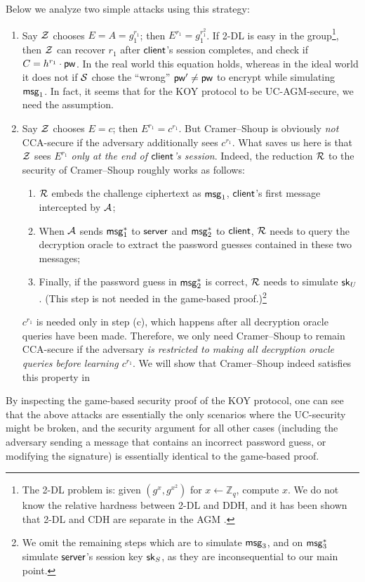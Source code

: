 Below we analyze two simple attacks using this strategy:
\begin{enumerate}
	\item Say $\mathcal{Z}$ chooses $E = A = g_1^{r_1}$; then $E^{r_1} = g_1^{r_1^2}$. If 2-DL is easy in the group\footnote{The 2-DL problem is: given $(g^x,g^{x^2})$ for $x \gets \mathbb{Z}_q$, compute $x$. We do not know the relative hardness between 2-DL and DDH, and it has been shown that 2-DL and CDH are separate in the AGM \cite{C:BauFucLos20}.}, then $\mathcal{Z}$ can recover $r_1$ after $\mathsf{client}$'s session completes, and check if $C = h^{r_1} \cdot \mathsf{pw}$. In the real world this equation holds, whereas in the ideal world it does not if $\mathcal{S}$ chose the ``wrong'' $\mathsf{pw}' \neq \mathsf{pw}$ to encrypt while simulating $\mathsf{msg}_{1}$. In fact, it seems that for the KOY protocol to be UC-AGM-secure, we need the  assumption. 
	\item Say $\mathcal{Z}$ chooses $E = c$; then $E^{r_1} = c^{r_1}$. But Cramer--Shoup is obviously \emph{not} CCA-secure if the adversary additionally sees $c^{r_1}$. What saves us here is that $\mathcal{Z}$ sees $E^{r_1}$ \emph{only at the end of $\mathsf{client}$'s session}. Indeed, the reduction $\mathcal{R}$ to the security of Cramer--Shoup roughly works as follows:
	\begin{enumerate}
		\item $\mathcal{R}$ embeds the challenge ciphertext as $\mathsf{msg}_{1}$, $\mathsf{client}$'s first message intercepted by $\mathcal{A}$;
		\item When $\mathcal{A}$ sends $\mathsf{msg}_{1}^*$ to $\mathsf{server}$ and $\mathsf{msg}_{2}^*$ to $\mathsf{client}$, $\mathcal{R}$ needs to query the decryption oracle to extract the password guesses contained in these two messages;
		\item Finally, if the password guess in $\mathsf{msg}_{2}^*$ is correct, $\mathcal{R}$ needs to simulate $\mathsf{sk}_U$. (This step is not needed in the game-based proof.)\footnote{We omit the remaining steps which are to simulate $\mathsf{msg}_{3}$, and on $\mathsf{msg}_{3}^*$ simulate $\mathsf{server}$'s session key $\mathsf{sk}_S$, as they are inconsequential to our main point.}
	\end{enumerate}
	$c^{r_1}$ is needed only in step (c), which happens after all decryption oracle queries have been made. Therefore, we only need Cramer--Shoup to remain CCA-secure if the adversary \emph{is restricted to making all decryption oracle queries before learning $c^{r_1}$}. We will show that Cramer--Shoup indeed satisfies this property in  
\end{enumerate}
By inspecting the game-based security proof of the KOY protocol, one can see that the above attacks are essentially the only scenarios where the UC-security might be broken, and the security argument for all other cases (including the adversary sending a message that contains an incorrect password guess, or modifying the signature) is essentially identical to the game-based proof.  